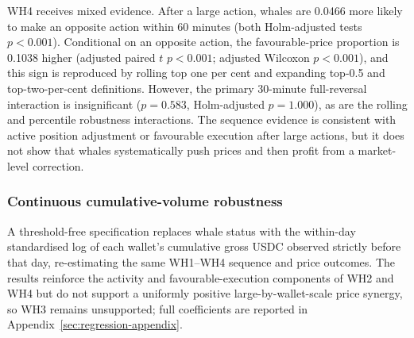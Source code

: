 WH4 receives mixed evidence. After a large action, whales are 0.0466 more
likely to make an opposite action within 60 minutes (both Holm-adjusted tests
$p<0.001$). Conditional on an opposite action, the favourable-price proportion
is 0.1038 higher (adjusted paired $t$ $p<0.001$; adjusted Wilcoxon $p<0.001$),
and this sign is reproduced by rolling top one per cent and expanding top-0.5
and top-two-per-cent definitions. However, the primary 30-minute full-reversal
interaction is insignificant ($p=0.583$, Holm-adjusted $p=1.000$), as are the
rolling and percentile robustness interactions. The sequence evidence is
consistent with active position adjustment or favourable execution after large
actions, but it does not show that whales systematically push prices and then
profit from a market-level correction.



\subsubsection{Continuous cumulative-volume robustness}
\label{sec:continuous-wallet-volume-results}

A threshold-free specification replaces whale status with the within-day
standardised log of each wallet's cumulative gross USDC observed strictly
before that day, re-estimating the same WH1--WH4 sequence and price outcomes.
The results reinforce the activity and favourable-execution components of WH2
and WH4 but do not support a uniformly positive large-by-wallet-scale price
synergy, so WH3 remains unsupported; full coefficients are reported in
Appendix~\ref{sec:regression-appendix}.
